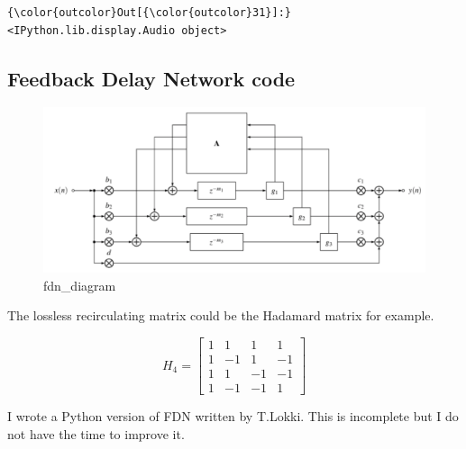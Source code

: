 \documentclass[11pt]{article}
\makeatletter
\def\maxwidth{\ifdim\Gin@nat@width>\linewidth\linewidth
    \else\Gin@nat@width\fi}
\let\Oldincludegraphics\includegraphics
\renewcommand{\includegraphics}[1]{\Oldincludegraphics[width=.8\maxwidth]{#1}}
\makeatother
\begin{document}
\begin{Verbatim}[commandchars=\\\{\}]
{\color{outcolor}Out[{\color{outcolor}31}]:} <IPython.lib.display.Audio object>
\end{Verbatim}
            
    \hypertarget{feedback-delay-network-code}{%
\subsection{Feedback Delay Network
code}\label{feedback-delay-network-code}}

\begin{figure}
\centering
\includegraphics{images/fdn_diagram.png}
\caption{fdn\_diagram}
\end{figure}

The lossless recirculating matrix could be the Hadamard matrix for
example.

\[
H_{4}=\left[ \begin{array}{cccc}{1} & {1} & {1} & {1} \\ {1} & {-1} & {1} & {-1} \\ {1} & {1} & {-1} & {-1} \\ {1} & {-1} & {-1} & {1}\end{array}\right]
\]

    I wrote a Python version of FDN written by T.Lokki. This is incomplete
but I do not have the time to improve it.
\end{document}
